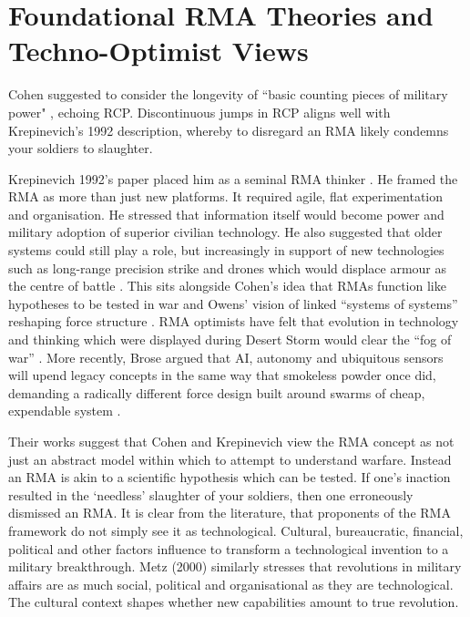 \section{Foundational RMA Theories and Techno-Optimist Views}

Cohen suggested to consider the longevity of ``basic counting pieces of
military power"  \parencite{COHEN_1995}, echoing RCP. Discontinuous jumps in RCP aligns well with Krepinevich's 1992 description, whereby to disregard an RMA likely condemns your soldiers to slaughter. 

Krepinevich 1992's paper placed him as a seminal RMA thinker \nocite{KREPINEVICH_1992}. He framed the RMA as more than just new platforms. It required agile, flat experimentation and organisation. He stressed that information itself would become power and military adoption of superior civilian technology. He also suggested that older systems could still play a role, but increasingly in support of new technologies such as long-range precision strike and drones which would displace armour as the centre of battle \nocite{KREPINEVICH_1992}. %
 This sits alongside Cohen’s idea that RMAs function like hypotheses to be tested in war \parencite{COHEN_1996} and Owens’ vision of linked “systems of systems” reshaping force structure \parencite{OWENS_2002}. RMA optimists have felt that evolution in technology and thinking which were displayed during Desert Storm would clear the ``fog of war''  \parencite[p.~49]{ALACH_2008}. More recently, Brose argued that AI, autonomy and ubiquitous sensors will upend legacy concepts in the same way that smokeless powder once did, demanding a radically different force design built around swarms of cheap, expendable system \parencite{BROSE_2019}.

Their works suggest that Cohen and Krepinevich view the RMA concept as not just an abstract model within which to attempt to understand warfare. Instead an RMA is akin to a scientific hypothesis which can be tested. If one's inaction resulted in the `needless' slaughter of your soldiers, then one erroneously dismissed an RMA. It is clear from the literature, that proponents of the RMA framework do not simply see it as technological. Cultural, bureaucratic, financial, political and other factors influence to transform a technological invention to a military breakthrough. Metz (2000) similarly stresses that revolutions in military affairs are as much social, political and organisational as they are technological\nocite{METZ_2000}. The cultural context shapes whether new capabilities amount to true revolution.

